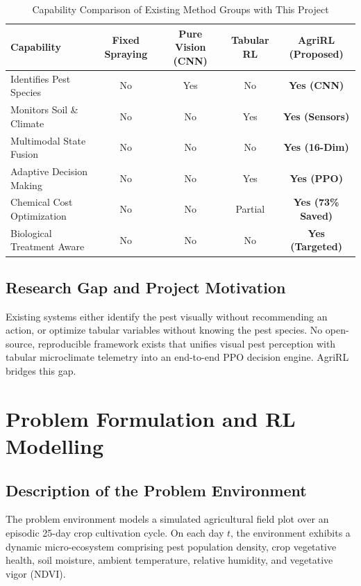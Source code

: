 \documentclass[12pt,a4paper]{report}
\begin{document}
\begin{table}[H]
\centering
\caption{Capability Comparison of Existing Method Groups with This Project}
\label{tab:comp_methods}
\begin{tabular}{lcccc}
\toprule
\textbf{Capability} & \textbf{Fixed Spraying} & \textbf{Pure Vision (CNN)} & \textbf{Tabular RL} & \textbf{AgriRL (Proposed)} \\
\midrule
Identifies Pest Species & No & Yes & No & \textbf{Yes (CNN)} \\
Monitors Soil \& Climate & No & No & Yes & \textbf{Yes (Sensors)} \\
Multimodal State Fusion & No & No & No & \textbf{Yes (16-Dim)} \\
Adaptive Decision Making & No & No & Yes & \textbf{Yes (PPO)} \\
Chemical Cost Optimization & No & No & Partial & \textbf{Yes (73\% Saved)} \\
Biological Treatment Aware & No & No & No & \textbf{Yes (Targeted)} \\
\bottomrule
\end{tabular}
\end{table}

\section{Research Gap and Project Motivation}
Existing systems either identify the pest visually without recommending an action, or optimize tabular variables without knowing the pest species. No open-source, reproducible framework exists that unifies visual pest perception with tabular microclimate telemetry into an end-to-end PPO decision engine. AgriRL bridges this gap.

\chapter{Problem Formulation and RL Modelling}

\section{Description of the Problem Environment}
The problem environment models a simulated agricultural field plot over an episodic 25-day crop cultivation cycle. On each day $t$, the environment exhibits a dynamic micro-ecosystem comprising pest population density, crop vegetative health, soil moisture, ambient temperature, relative humidity, and vegetative vigor (NDVI).
\end{document}
